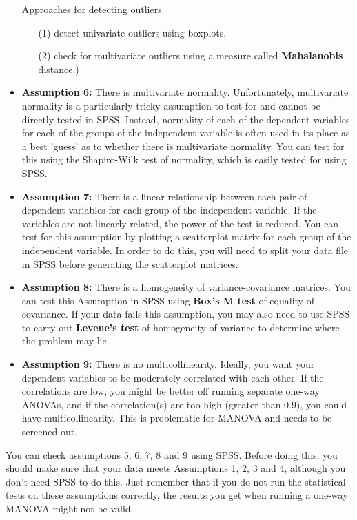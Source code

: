 \documentclass[a4paper,12pt]{article}
\begin{document}
\begin{itemize}
\begin{framed}Approaches for detecting outliers
    \begin{itemize} 
    \item[(1)] detect univariate outliers using boxplots,  
    \item[(2)] check for multivariate outliers using a measure called \textbf{Mahalanobis} distance.)
\end{itemize}
\end{framed}
\item \textbf{Assumption 6:} There is multivariate normality. Unfortunately, multivariate normality is a particularly tricky assumption to test for and cannot be directly tested in SPSS. Instead, normality of each of the dependent variables for each of the groups of the independent variable is often used in its place as a best 'guess' as to whether there is multivariate normality. You can test for this using the Shapiro-Wilk test of normality, which is easily tested for using SPSS. \\

\item \textbf{Assumption 7:} There is a linear relationship between each pair of dependent variables for each group of the independent variable. If the variables are not linearly related, the power of the test is reduced. You can test for this  assumption by plotting a scatterplot matrix for each group of the independent variable. In order to do this, you will need to split your data file in SPSS before generating the scatterplot matrices.
\item \textbf{Assumption 8:} There is a homogeneity of variance-covariance matrices. You can test this Assumption in SPSS using \textbf{Box's M test} of equality of covariance. If your data fails this assumption, you may also need to use SPSS to carry out \textbf{Levene's test} of homogeneity of variance to determine where the problem may lie.

\item \textbf{Assumption 9:} There is no multicollinearity. Ideally, you want your dependent variables to be moderately correlated with each other. If the correlations are low, you might be better off running separate one-way ANOVAs, and if the correlation(s) are too high (greater than 0.9), you could have multicollinearity. This is problematic for MANOVA and needs to be screened out.
\end{itemize}

You can check assumptions 5, 6, 7, 8 and 9 using SPSS. Before doing this, you should make sure that your data meets Assumptions 1, 2, 3 and 4, although you don't need SPSS to do this. Just remember that if you do not run the statistical tests on these assumptions correctly, the results you get when running a one-way MANOVA might not be valid.
\newpage
\end{document}
